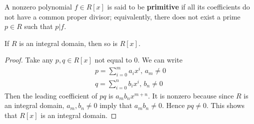 \begin{df}
A nonzero polynomial $f\in R[x]$ is said to be \textbf{primitive} if all its coefficients do not have a common proper divisor; equivalently, there does not exist a prime $p\in R$ such that $p|f$.
\end{df}

\begin{lem}\label{polyintdom}
If $R$ is an integral domain, then so is $R[x]$.
\end{lem}
\begin{proof}
Take any $p,q\in R[x]$ not equal to 0. We can write
\begin{eqnarray*}
p=\sum_{i=0}^m a_ix^i,\,a_m\neq 0\\
q=\sum_{i=0}^n b_ix^i,\, b_n\neq 0
\end{eqnarray*}
Then the leading coefficient of $pq$ is $a_mb_nx^{m+n}$. It is nonzero because since $R$ is an integral domain, $a_m,b_n\neq 0$ imply that $a_mb_n\neq 0$. Hence $pq\neq 0$. This shows that $R[x]$ is an integral domain.
\end{proof}

